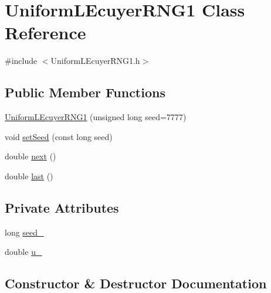 \hypertarget{class_uniform_l_ecuyer_r_n_g1}{}\section{Uniform\+L\+Ecuyer\+R\+N\+G1 Class Reference}
\label{class_uniform_l_ecuyer_r_n_g1}


{\ttfamily \#include $<$Uniform\+L\+Ecuyer\+R\+N\+G1.\+h$>$}

\subsection*{Public Member Functions}
\begin{DoxyCompactItemize}
\item 
\hyperlink{class_uniform_l_ecuyer_r_n_g1_a337fc3fe276e950c8ef9e330779eedb7}{Uniform\+L\+Ecuyer\+R\+N\+G1} (unsigned long seed=7777)
\item 
void \hyperlink{class_uniform_l_ecuyer_r_n_g1_a33e1ea51eb633a14e84d45d8c31a4e8b}{set\+Seed} (const long seed)
\item 
double \hyperlink{class_uniform_l_ecuyer_r_n_g1_a6a166e0bef412d4c85565ec0017ae489}{next} ()
\item 
double \hyperlink{class_uniform_l_ecuyer_r_n_g1_aaed8bab7d34f76064ca34b1d35b204f4}{last} ()
\end{DoxyCompactItemize}
\subsection*{Private Attributes}
\begin{DoxyCompactItemize}
\item 
long \hyperlink{class_uniform_l_ecuyer_r_n_g1_ab722b90ba6d65dea6874ccede2edc921}{seed\+\_\+}
\item 
double \hyperlink{class_uniform_l_ecuyer_r_n_g1_ae14608c81e072a8f46ef2dd9b865e90c}{u\+\_\+}
\end{DoxyCompactItemize}


\subsection{Constructor \& Destructor Documentation}
\hypertarget{class_uniform_l_ecuyer_r_n_g1_a337fc3fe276e950c8ef9e330779eedb7}{}\label{class_uniform_l_ecuyer_r_n_g1_a337fc3fe276e950c8ef9e330779eedb7} 
